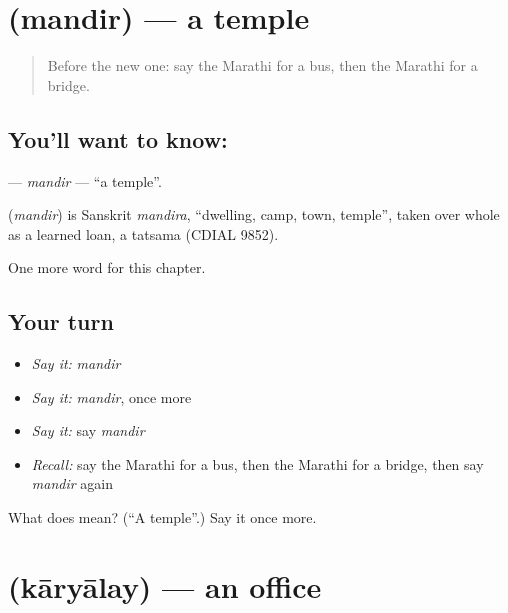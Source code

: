 \section[\texorpdfstring{\mr{मंदिर} (mandir)}{मंदिर (mandir)}]{ (mandir) — a temple}

\label{lesson:MR-C114-mandir}



\begin{quote}
Before the new one: say the Marathi for a bus, then the Marathi for a bridge.
\end{quote}

\subsection*{You'll want to know: }
\textbf{} — \emph{mandir} — \textquotedblleft{}a temple\textquotedblright{}.

\begin{cousinweb}
\textbf{} (\emph{mandir}) is Sanskrit \emph{mandira}, \textquotedblleft{}dwelling, camp, town, temple\textquotedblright{}, taken over whole as a learned loan, a tatsama (CDIAL 9852).
\end{cousinweb}

\begin{grammarlens}[title={What you've built}]
One more word for this chapter.
\end{grammarlens}

\subsection*{Your turn}
\begin{itemize}
\raggedright
  \item \emph{Say it:} \emph{mandir}
  \item \emph{Say it:} \emph{mandir}, once more
  \item \emph{Say it:} say \emph{mandir}
  \item \emph{Recall:} say the Marathi for a bus, then the Marathi for a bridge, then say \emph{mandir} again
\end{itemize}

\begin{tcolorbox}[breakable,colback=teal!4,colframe=teal!35!black,title={Before you move on}]
What does  mean? (\textquotedblleft{}A temple\textquotedblright{}.) Say it once more.
\end{tcolorbox}
\section[\texorpdfstring{\mr{कार्यालय} (kāryālay)}{कार्यालय (kāryālay)}]{ (kāryālay) — an office}

